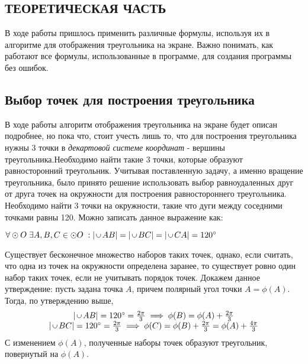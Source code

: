 \documentclass[14pt]{extarticle}
\newcommand\myheight{0.9ex} %
\newcommand\mywidth {1.2ex} %
\newcommand\mylinew {0.1ex} %
\newcommand\spaceba {0.4ex} %
\newcommand{\mycup}
{
  \hspace{\spaceba}
  \tikz[line width=\mylinew,line cap=round]
    \draw (0,\myheight) -- (0,0.5*\mywidth) arc (-180:0:0.5*\mywidth) -- (\mywidth,\myheight);
  \hspace{\spaceba}
}
\begin{document}
{%
    \begin{spacing}{1.5}
    {
        \centering\section{ТЕОРЕТИЧЕСКАЯ ЧАСТЬ}
        \par
    }
    В ходе работы пришлось применить различные формулы, используя их в алгоритме для отображения треугольника на экране. Важно понимать, как работают все формулы, использованные в программе, для создания программы без ошибок.
    \par
    {
        \vspace{1em}
        \subsection{Выбор точек для построения треугольника}
        \label{sec:trianglepoints}
        \par
    } 
    В ходе работы алгоритм отображения треугольника на экране будет описан подробнее, но пока что, стоит учесть лишь то, что для построения треугольника нужны 3 точки в \textit{декартовой системе координат} - вершины треугольника.Необходимо найти такие 3 точки, которые образуют равносторонний треугольник. Учитывая поставленную задачу, а именно вращение треугольника, было принято решение использовать выбор равноудаленных друг от друга точек на окружности для построения равностороннего треугольника. Необходимо найти 3 точки на окружности, такие что дуги между соседними точками равны 120\degree. Можно записать данное выражение как:
    \par
    \vspace{1em}
    \begin{center}
    $
        \forall \odot O \; \exists A, B, C \in \odot O \; : \lvert\mycup{AB}\rvert = \lvert\mycup{BC}\rvert = \lvert\mycup{CA}\rvert = 120^\circ
    $
    \end{center}
    \par
    Существует бесконечное множество наборов таких точек, однако, если считать, что одна из точек на окружности определена заранее, то существует ровно один набор таких точек, если не учитывать порядок точек. Докажем данное утверждение: пусть задана точка $A$, причем полярный угол точки $A = \phi(A)$. Тогда, по утверждению выше,
    \[
        \begin{array}{c}
        \lvert\mycup{AB}\rvert = 120\degree = \frac{2\pi}{3} \implies \phi(B) = \phi(A) + \frac{2\pi}{3} \\
        \lvert\mycup{BC}\rvert = 120\degree = \frac{2\pi}{3} \implies \phi(C) = \phi(B) + \frac{2\pi}{3} = \phi(A) + \frac{4\pi}{3}
        \end{array}
    \]
    С изменением $\phi(A)$, полученные наборы точек образуют треугольник, повернутый на $\phi(A)$.
    {
        \par
}
\end{spacing}}
\end{document}
